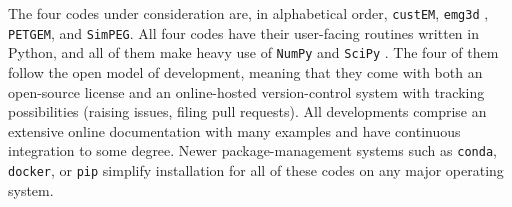 \documentclass[a4paper, extra, camera,%
]{gji}
\newcommand{\simpeg}{\texttt{SimPEG}\xspace}
\newcommand{\custem}{\texttt{custEM}\xspace}
\newcommand{\petgem}{\texttt{PETGEM}\xspace}
\begin{document}
The four codes under consideration are, in alphabetical order, \custem \citep{GEO.19.Rochlitz}, \texttt{emg3d} \citep{JOSS.19.Werthmuller}, \petgem \citep{CAG.18.CastilloReyes, GJI.19.CastilloReyes}, and \simpeg \citep{CAG.15.Cockett, CAG.17.Heagy}. All four codes have their user-facing routines written in Python, and all of them make heavy use of \texttt{NumPy} \citep{NAT.20.Harris} and \texttt{SciPy} \citep{NM.20.Virtanen}. The four of them follow the open model of development, meaning that they come with both an open-source license and an online-hosted version-control system with tracking possibilities (raising issues, filing pull requests). All developments comprise an extensive online documentation with many examples and have continuous integration to some degree. Newer package-management systems such as \texttt{conda}, \texttt{docker}, or \texttt{pip} simplify installation for all of these codes on any major operating system.

\end{document}
